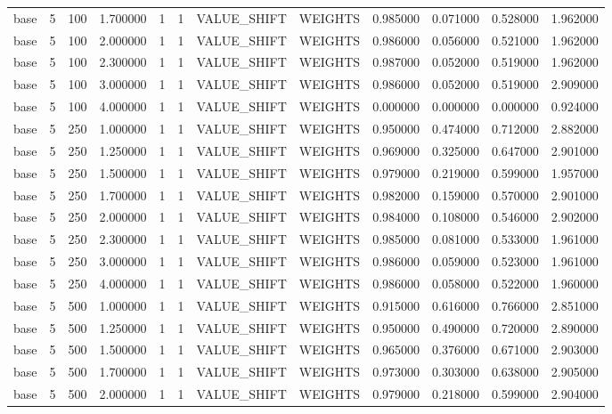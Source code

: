 \begin{tabular}{lrrrllllrrrr}
base & 5 & 100 & 1.700000 & 1 & 1 & VALUE_SHIFT & WEIGHTS & 0.985000 & 0.071000 & 0.528000 & 1.962000 \\
base & 5 & 100 & 2.000000 & 1 & 1 & VALUE_SHIFT & WEIGHTS & 0.986000 & 0.056000 & 0.521000 & 1.962000 \\
base & 5 & 100 & 2.300000 & 1 & 1 & VALUE_SHIFT & WEIGHTS & 0.987000 & 0.052000 & 0.519000 & 1.962000 \\
base & 5 & 100 & 3.000000 & 1 & 1 & VALUE_SHIFT & WEIGHTS & 0.986000 & 0.052000 & 0.519000 & 2.909000 \\
base & 5 & 100 & 4.000000 & 1 & 1 & VALUE_SHIFT & WEIGHTS & 0.000000 & 0.000000 & 0.000000 & 0.924000 \\
base & 5 & 250 & 1.000000 & 1 & 1 & VALUE_SHIFT & WEIGHTS & 0.950000 & 0.474000 & 0.712000 & 2.882000 \\
base & 5 & 250 & 1.250000 & 1 & 1 & VALUE_SHIFT & WEIGHTS & 0.969000 & 0.325000 & 0.647000 & 2.901000 \\
base & 5 & 250 & 1.500000 & 1 & 1 & VALUE_SHIFT & WEIGHTS & 0.979000 & 0.219000 & 0.599000 & 1.957000 \\
base & 5 & 250 & 1.700000 & 1 & 1 & VALUE_SHIFT & WEIGHTS & 0.982000 & 0.159000 & 0.570000 & 2.901000 \\
base & 5 & 250 & 2.000000 & 1 & 1 & VALUE_SHIFT & WEIGHTS & 0.984000 & 0.108000 & 0.546000 & 2.902000 \\
base & 5 & 250 & 2.300000 & 1 & 1 & VALUE_SHIFT & WEIGHTS & 0.985000 & 0.081000 & 0.533000 & 1.961000 \\
base & 5 & 250 & 3.000000 & 1 & 1 & VALUE_SHIFT & WEIGHTS & 0.986000 & 0.059000 & 0.523000 & 1.961000 \\
base & 5 & 250 & 4.000000 & 1 & 1 & VALUE_SHIFT & WEIGHTS & 0.986000 & 0.058000 & 0.522000 & 1.960000 \\
base & 5 & 500 & 1.000000 & 1 & 1 & VALUE_SHIFT & WEIGHTS & 0.915000 & 0.616000 & 0.766000 & 2.851000 \\
base & 5 & 500 & 1.250000 & 1 & 1 & VALUE_SHIFT & WEIGHTS & 0.950000 & 0.490000 & 0.720000 & 2.890000 \\
base & 5 & 500 & 1.500000 & 1 & 1 & VALUE_SHIFT & WEIGHTS & 0.965000 & 0.376000 & 0.671000 & 2.903000 \\
base & 5 & 500 & 1.700000 & 1 & 1 & VALUE_SHIFT & WEIGHTS & 0.973000 & 0.303000 & 0.638000 & 2.905000 \\
base & 5 & 500 & 2.000000 & 1 & 1 & VALUE_SHIFT & WEIGHTS & 0.979000 & 0.218000 & 0.599000 & 2.904000 \\

\end{tabular}
